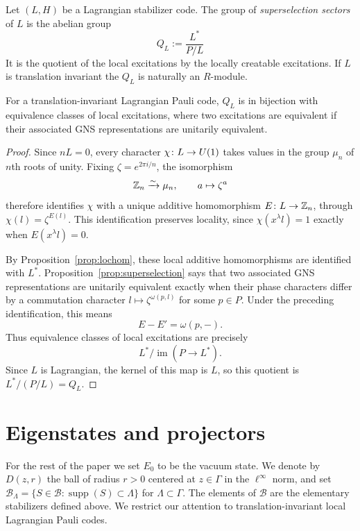 \documentclass[11pt]{amsart}
\begin{document}
\begin{defn}
Let $(L,H)$ be a Lagrangian stabilizer code. The group of \emph{superselection sectors} of $L$ is the abelian group
\[Q_L:= \frac{L^*}{P/L} \]
It is the quotient of the local excitations by the locally creatable excitations. If $L$ is translation invariant the $Q_L$ is naturally an $R$-module. 
\end{defn}
\begin{lem}\label{lem:local-excitation-classes}
For a translation-invariant Lagrangian Pauli code, $Q_L$ is in bijection with equivalence classes of local excitations, where two excitations are equivalent if their associated GNS representations are unitarily equivalent.
\end{lem}
\begin{proof}
Since $nL=0$, every character $\chi\colon L\to U(1)$ takes values in the group $\mu_n$ of $n$th roots of unity. Fixing $\zeta=e^{2\pi i/n}$, the isomorphism
\[
\mathbb{Z}_n\xrightarrow{\sim}\mu_n,\qquad a\mapsto\zeta^a
\]
therefore identifies $\chi$ with a unique additive homomorphism $E\colon L\to\mathbb{Z}_n$, through $\chi(l)=\zeta^{E(l)}$. This identification preserves locality, since $\chi(x^\lambda l)=1$ exactly when $E(x^\lambda l)=0$.

By Proposition~\ref{prop:lochom}, these local additive homomorphisms are identified with $L^*$. Proposition~\ref{prop:superselection} says that two associated GNS representations are unitarily equivalent exactly when their phase characters differ by a commutation character $l\mapsto\zeta^{\omega(p,l)}$ for some $p\in P$. Under the preceding identification, this means
\[
E-E'=\omega(p,-).
\]
Thus equivalence classes of local excitations are precisely
\[
L^*/\operatorname{im}(P\to L^*).
\]
Since $L$ is Lagrangian, the kernel of this map is $L$, so this quotient is $L^*/(P/L)=Q_L$.
\end{proof}

\section{Eigenstates and projectors}
For the rest of the paper we set $E_0$ to be the vacuum state. We denote by $D(z,r)$ the ball of radius $r>0$ centered at $z\in\Gamma$ in the $\ell^\infty$ norm, and set $\mathcal B_\Lambda=\{S\in\mathcal B:\operatorname{supp}(S)\subset\Lambda\}$ for $\Lambda\subset\Gamma$. The elements of $\mathcal B$ are the elementary stabilizers defined above. We restrict our attention to translation-invariant local Lagrangian Pauli codes.
\end{document}
